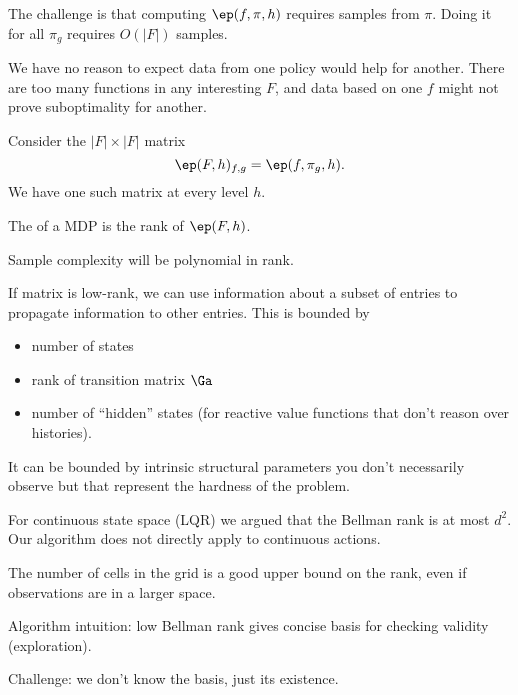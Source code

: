 The challenge is that computing $\ep(f,\pi,h)$ requires samples from $\pi$. Doing it for all $\pi_g$ requires $O(|F|)$ samples.

We have no reason to expect data from one policy would help for another. There are too many functions in any interesting $F$, and data based on one $f$ might not prove suboptimality for another.

Consider the $|F|\times|F|$ matrix
$$
\ep(F,h)_{f,g} = \ep(f,\pi_g,h).
$$
We have one such matrix at every level $h$.
\begin{df}
The  of a MDP is the rank of $\ep(F,h)$.
\end{df}
Sample complexity will be polynomial in rank.

If matrix is low-rank, we can use information about a subset of entries to propagate information to other entries.
This is bounded by
\begin{itemize}
\item
number of states
\item
rank of transition matrix $\Ga$
\item
number of ``hidden'' states (for reactive value functions that don't reason over histories).
\end{itemize}
It can be bounded by intrinsic structural parameters you don't necessarily observe but that represent the hardness of the problem.

For continuous state space (LQR) we argued that the Bellman rank is at most $d^2$. Our algorithm does not directly apply to continuous actions.


The number of cells in the grid is a good upper bound on the rank, even if observations are in a larger space.

Algorithm intuition:  low Bellman rank gives concise basis for checking validity (exploration). 

Challenge: we don't know the basis, just its existence.

